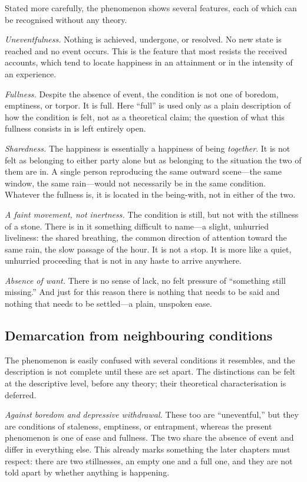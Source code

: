 Stated more carefully, the phenomenon shows several features, each of which can be recognised without any theory.

\emph{Uneventfulness.} Nothing is achieved, undergone, or resolved. No new state is reached and no event occurs. This is the feature that most resists the received accounts, which tend to locate happiness in an attainment or in the intensity of an experience.

\emph{Fullness.} Despite the absence of event, the condition is not one of boredom, emptiness, or torpor. It is full. Here ``full'' is used only as a plain description of how the condition is felt, not as a theoretical claim; the question of what this fullness consists in is left entirely open.

\emph{Sharedness.} The happiness is essentially a happiness of being \emph{together}. It is not felt as belonging to either party alone but as belonging to the situation the two of them are in. A single person reproducing the same outward scene---the same window, the same rain---would not necessarily be in the same condition. Whatever the fullness is, it is located in the being-with, not in either of the two.

\emph{A faint movement, not inertness.} The condition is still, but not with the stillness of a stone. There is in it something difficult to name---a slight, unhurried liveliness: the shared breathing, the common direction of attention toward the same rain, the slow passage of the hour. It is not a stop. It is more like a quiet, unhurried proceeding that is not in any haste to arrive anywhere.

\emph{Absence of want.} There is no sense of lack, no felt pressure of ``something still missing.'' And just for this reason there is nothing that needs to be said and nothing that needs to be settled---a plain, unspoken ease.

\subsection*{Demarcation from neighbouring conditions}
\label{p19:sub:phen-demarcation}

The phenomenon is easily confused with several conditions it resembles, and the description is not complete until these are set apart. The distinctions can be felt at the descriptive level, before any theory; their theoretical characterisation is deferred.

\emph{Against boredom and depressive withdrawal.} These too are ``uneventful,'' but they are conditions of staleness, emptiness, or entrapment, whereas the present phenomenon is one of ease and fullness. The two share the absence of event and differ in everything else. This already marks something the later chapters must respect: there are two stillnesses, an empty one and a full one, and they are not told apart by whether anything is happening.

